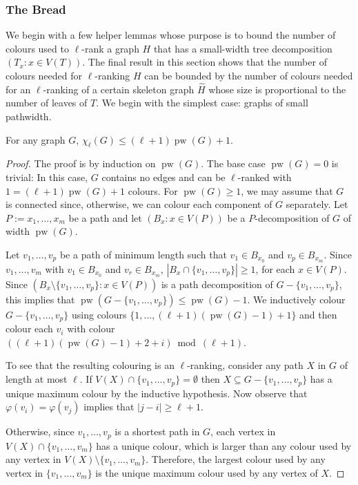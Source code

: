 \documentclass[kpfonts]{patmorin}
\DeclareMathOperator{\pw}{pw}
\newcommand{\lrn}{\chi_{\ell}}
\theoremstyle{named}
\begin{document}
\subsubsection{The Bread}

We begin with a few helper lemmas whose purpose is to bound the number of colours used to $\ell$-rank a graph $H$ that has a small-width tree decomposition $(T_x:x\in V(T))$.  The final result in this section shows that the number of colours needed for $\ell$-ranking $H$ can be bounded by the number of colours needed for an $\ell$-ranking of a certain skeleton graph $\hat{H}$ whose size is proportional to the number of leaves of $T$. We begin with the simplest case: graphs of small pathwidth.

\begin{lem}\label{pathwidth}
    For any graph $G$, $\lrn(G)\le (\ell+1)\pw(G) + 1$.
\end{lem}

\begin{proof}
    The proof is by induction on $\pw(G)$.  The base case $\pw(G)=0$ is trivial: In this case, $G$ contains no edges and can be $\ell$-ranked with $1 = (\ell+1)\pw(G)+1$ colours.   For $\pw(G)\ge 1$, we may assume that $G$ is connected since, otherwise, we can colour each component of $G$ separately. Let $P:=x_1,\ldots,x_m$ be a path and let $(B_x:x\in V(P))$ be a $P$-decomposition of $G$ of width $\pw(G)$.
    
    Let $v_1,\ldots,v_p$ be a path of minimum length such that $v_1\in B_{x_0}$ and $v_p\in B_{x_m}$.  Since $v_1,\ldots,v_m$ with $v_1\in B_{x_0}$ and $v_r\in B_{x_m}$,  $|B_x\cap\{v_1,\ldots,v_p\}|\ge 1$, for each $x\in V(P)$.  Since $(B_x\setminus\{v_1,\ldots,v_p\}:x\in V(P))$ is a path decomposition of $G-\{v_1,\ldots,v_p\}$, this implies that $\pw(G-\{v_1,\ldots,v_p\})\le \pw(G)-1$.  We inductively colour $G-\{v_1,\ldots,v_p\}$ using colours $\{1,\ldots,(\ell+1)(\pw(G)-1)+1\}$ and then colour each $v_i$ with colour $((\ell+1)(\pw(G)-1)+2+i)\bmod (\ell+1)$.

    To see that the resulting colouring is an $\ell$-ranking, consider any path $X$ in $G$ of length at most $\ell$.  If $V(X)\cap\{v_1,\ldots,v_p\}=\emptyset$ then $X\subseteq G-\{v_1,\ldots,v_p\}$ has a unique maximum colour by the inductive hypothesis.  Now observe that $\varphi(v_i)=\varphi(v_j)$ implies that $|j-i|\ge \ell+1$.
    
    
    Otherwise, since $v_1,\ldots,v_p$ is a shortest path in $G$, each vertex in $V(X)\cap\{v_1,\ldots,v_m\}$ has a unique colour, which is larger than any colour used by any vertex in $V(X)\setminus\{v_1,\ldots,v_m\}$.  Therefore, the largest colour used by any vertex in $\{v_1,\ldots,v_m\}$ is the unique maximum colour used by any vertex of $X$.
\end{proof}
\end{document}
